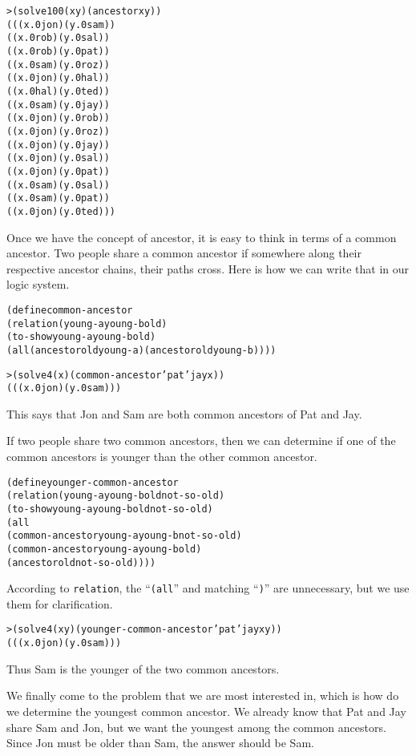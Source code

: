 \begin{alltt}
> (solve 100 (x y) (ancestor x y))
(((x.0 jon) (y.0 sam))
 ((x.0 rob) (y.0 sal))
 ((x.0 rob) (y.0 pat))
 ((x.0 sam) (y.0 roz))
 ((x.0 jon) (y.0 hal))
 ((x.0 hal) (y.0 ted))
 ((x.0 sam) (y.0 jay))
 ((x.0 jon) (y.0 rob))
 ((x.0 jon) (y.0 roz))
 ((x.0 jon) (y.0 jay))
 ((x.0 jon) (y.0 sal))
 ((x.0 jon) (y.0 pat))
 ((x.0 sam) (y.0 sal))
 ((x.0 sam) (y.0 pat))
 ((x.0 jon) (y.0 ted)))
\end{alltt}

Once we have the concept of ancestor, it is easy to think in terms of
a common ancestor.  Two people share a common ancestor if somewhere
along their respective ancestor chains, their paths cross.  Here is
how we can write that in our logic system.

\begin{alltt}
(define common-ancestor
  (relation (young-a young-b old)
    (to-show young-a young-b old)
    (all (ancestor old young-a) (ancestor old young-b))))

> (solve 4 (x) (common-ancestor 'pat 'jay x))
(((x.0 jon) (y.0 sam)))
\end{alltt}

\noindent
This says that Jon and Sam are both common
ancestors of Pat and Jay.

If two people share two common ancestors, then we can determine if one
of the common ancestors is younger than the other common ancestor.

\begin{alltt}
(define younger-common-ancestor
  (relation (young-a young-b old not-so-old)
    (to-show young-a young-b old not-so-old)
    (all
      (common-ancestor young-a young-b not-so-old)
      (common-ancestor young-a young-b old)
      (ancestor old not-so-old))))
\end{alltt}

\noindent
According to \texttt{relation}, the ``\texttt{(all}'' and matching
``\texttt{)}'' are unnecessary, but we use them for clarification.

\begin{alltt}
> (solve 4 (x y) (younger-common-ancestor 'pat 'jay x y))
(((x.0 jon) (y.0 sam)))
\end{alltt}

\noindent
Thus Sam is the younger of the two common ancestors.

We finally come to the problem that we are most interested in, which
is how do we determine the youngest common ancestor.  We already know
that Pat and Jay share Sam and Jon, but we want the youngest among the
common ancestors. Since Jon must be older than Sam, the answer should
be Sam.

